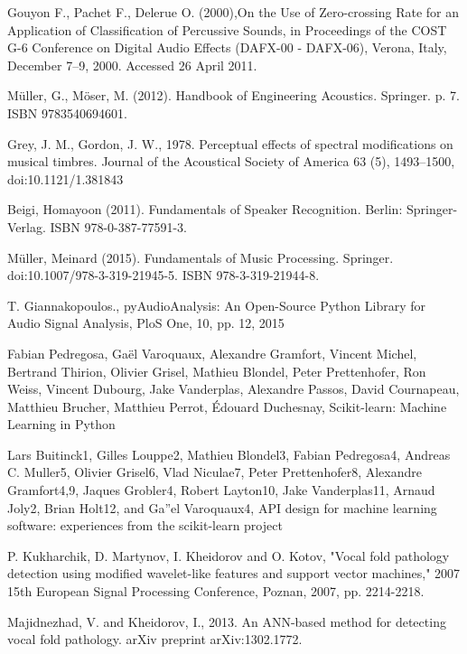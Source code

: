 \documentclass[conference]{IEEEtran}
\begin{document}
\begin{thebibliography}{00}
	
 Gouyon F., Pachet F., Delerue O. (2000),On the Use of Zero-crossing Rate for an Application of Classification of Percussive Sounds, in Proceedings of the COST G-6 Conference on Digital Audio Effects (DAFX-00 - DAFX-06), Verona, Italy, December 7–9, 2000. Accessed 26 April 2011.

Müller, G., Möser, M. (2012). Handbook of Engineering Acoustics. Springer. p. 7. ISBN 9783540694601.

Grey, J. M., Gordon, J. W., 1978. Perceptual effects of spectral modifications on musical timbres. Journal of the Acoustical Society of America 63 (5), 1493–1500, doi:10.1121/1.381843

Beigi, Homayoon (2011). Fundamentals of Speaker Recognition. Berlin: Springer-Verlag. ISBN 978-0-387-77591-3.

Müller, Meinard (2015). Fundamentals of Music Processing. Springer. doi:10.1007/978-3-319-21945-5. ISBN 978-3-319-21944-8.

T. Giannakopoulos., pyAudioAnalysis: An Open-Source Python Library for Audio Signal Analysis, PloS One, 10, pp. 12, 2015

Fabian Pedregosa, Gaël Varoquaux, Alexandre Gramfort, Vincent Michel, Bertrand Thirion, Olivier Grisel, Mathieu Blondel, Peter Prettenhofer, Ron Weiss, Vincent Dubourg, Jake Vanderplas, Alexandre Passos, David Cournapeau, Matthieu Brucher, Matthieu Perrot, Édouard Duchesnay, Scikit-learn: Machine Learning in Python

Lars Buitinck1, Gilles Louppe2, Mathieu Blondel3, Fabian Pedregosa4, Andreas C. Muller5, Olivier Grisel6, Vlad Niculae7, Peter Prettenhofer8, Alexandre Gramfort4,9, Jaques Grobler4, Robert Layton10, Jake Vanderplas11, Arnaud Joly2, Brian Holt12, and Ga''el Varoquaux4, API design for machine learning software: experiences from the scikit-learn project

P. Kukharchik, D. Martynov, I. Kheidorov and O. Kotov, "Vocal fold pathology detection using modified wavelet-like features and support vector machines," 2007 15th European Signal Processing Conference, Poznan, 2007, pp. 2214-2218.

Majidnezhad, V. and Kheidorov, I., 2013. An ANN-based method for detecting vocal fold pathology. arXiv preprint arXiv:1302.1772.


\end{thebibliography}
\end{document}

